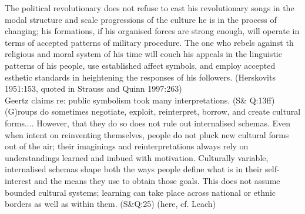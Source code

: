 The political revolutionary does not refuse to cast his revolutionary songs in the modal structure and scale progressions of the culture he is in the process of changing; his formations, if his organised forces are strong enough, will operate in terms of accepted patterns of military procedure. The one who rebels against th religious and moral system of his time will couch his appeals in the linguistic patterns of his people, use established affect symbols, and employ accepted esthetic standards in heightening the responses of his followers. (Herskovits 1951:153, quoted in Strauss and Quinn 1997:263)
\\
Geertz claims re: public symbolism took many interpretations. (S\& Q:13ff)
(G)roups do sometimes negotiate, exploit, reinterpret, borrow, and create cultural forms.... However, that they do so does not rule out internalised schemas. Even when intent on reinventing themselves, people do not pluck new cultural forms out of the air; their imaginings and reinterpretations always rely on understandings learned and imbued with motivation. Culturally variable, internalised schemas shape both the ways people define what is in their self-interest and the means they use to obtain those goals. This does not assume bounded cultural systems; learning can take place across national or ethnic borders as well as within them. (S\&Q:25)
(here, cf. Leach)


